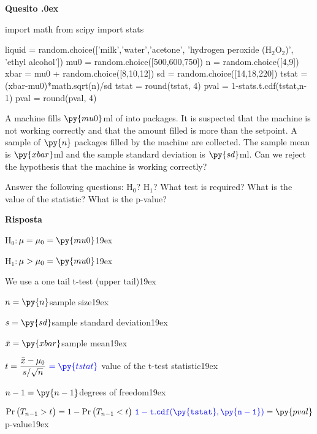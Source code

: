 \documentclass[11pt,twoside,a4paper]{article}
\newcounter{quesito}
\newenvironment{question}{\bigskip\addtocounter{quesito}{1}\bigskip\bigskip\par\textbf{Quesito \thequesito.\kern0ex}}{\par\vspace{\parskip}}
\newenvironment{answer}{\par\textbf{Risposta\quad}}{\par\vspace{\parskip}}
\begin{document}
\clearpage
\begin{question}
\begin{pycode}
import math
from scipy import stats

liquid = random.choice(['milk','water','acetone', 'hydrogen peroxide (H$_2$O$_2$)', 'ethyl alcohol'])
mu0 = random.choice([500,600,750])
n = random.choice([4,9])
xbar = mu0 + random.choice([8,10,12])
sd = random.choice([14,18,220])
tstat = (xbar-mu0)*math.sqrt(n)/sd
tstat = round(tstat, 4)
pval = 1-stats.t.cdf(tstat,n-1)
pval = round(pval, 4)
\end{pycode}
A machine fills $\py{mu0}$ml of  into packages. It is suspected that the machine is not working correctly and that the amount filled is more than the setpoint. A sample of $\py{n}$ packages filled by the machine are collected. The sample mean is $\py{xbar}$ml and the sample standard deviation is $\py{sd}$ml. Can we reject the hypothesis that the machine is working correctly?

Answer the following questions: H$_0$? H$_1$? What test is required? What is the value of the statistic? What is the p-value? 


\begin{answer}

  {\color{blue}H$_0:$\hfill $\mu = \mu_0 = \py{mu0}$}\kern19ex
  
  {\color{blue}H$_1:$\hfill $\mu>\mu_0 = \py{mu0}$}\kern19ex
  
  {\color{blue}We use a one tail t-test (upper tail)}\kern19ex
  
  $n = \py{n}$\hfill sample size\kern19ex
  
  $s = \py{sd}$\hfill sample standard deviation\kern19ex
  
  $\bar{x} = \py{xbar}$\hfill sample mean\kern19ex
  
  $t = \displaystyle\frac{\bar{x}-\mu_0}{s/\sqrt{n}}\ {\color{blue} = \py{tstat}}$\hfill{\color{blue} value of the t-test statistic}\kern19ex
  
  $n-1 = \py{n-1}$\hfill degrees of freedom\kern19ex
  
  $\Pr\big(T_{n-1}>t\big) = 1- \Pr\big(T_{n-1}<t\big)\ {\color{blue}\tt 1 - t.cdf(\py{tstat}, \py{n-1})}= \py{pval}$\hfill{\color{blue} p-value}\kern19ex

\end{answer}
\end{question}
\end{document}
